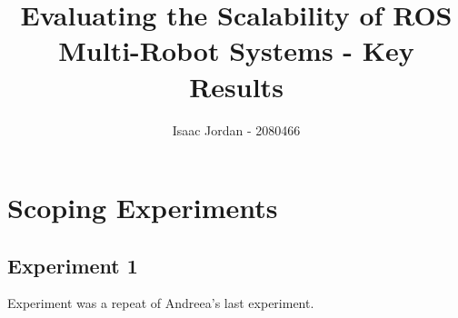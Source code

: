 \documentclass[11pt]{article}
\title{Evaluating the Scalability of ROS Multi-Robot Systems - Key Results}
\author{Isaac Jordan - 2080466}
\begin{document}
\maketitle

\chapter{Scoping Experiments}

\section{Experiment 1}

Experiment was a repeat of Andreea's last experiment. 
\end{document}
